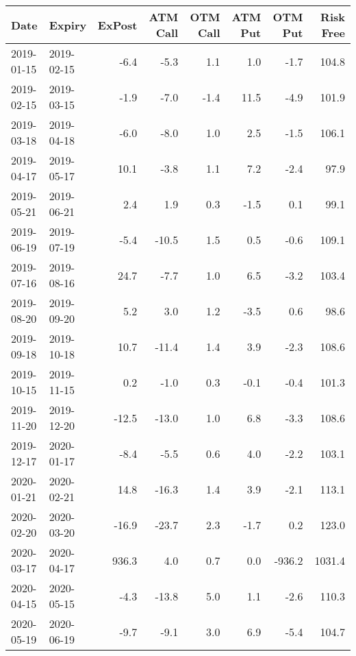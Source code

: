 \begin{tabular}{llrrrrrr}
\hline
 Date       & Expiry     &   ExPost &   ATM Call &   OTM Call &   ATM Put &   OTM Put &   Risk Free \\
\hline
 2019-01-15 & 2019-02-15 &     -6.4 &       -5.3 &        1.1 &       1.0 &      -1.7 &       104.8 \\
 2019-02-15 & 2019-03-15 &     -1.9 &       -7.0 &       -1.4 &      11.5 &      -4.9 &       101.9 \\
 2019-03-18 & 2019-04-18 &     -6.0 &       -8.0 &        1.0 &       2.5 &      -1.5 &       106.1 \\
 2019-04-17 & 2019-05-17 &     10.1 &       -3.8 &        1.1 &       7.2 &      -2.4 &        97.9 \\
 2019-05-21 & 2019-06-21 &      2.4 &        1.9 &        0.3 &      -1.5 &       0.1 &        99.1 \\
 2019-06-19 & 2019-07-19 &     -5.4 &      -10.5 &        1.5 &       0.5 &      -0.6 &       109.1 \\
 2019-07-16 & 2019-08-16 &     24.7 &       -7.7 &        1.0 &       6.5 &      -3.2 &       103.4 \\
 2019-08-20 & 2019-09-20 &      5.2 &        3.0 &        1.2 &      -3.5 &       0.6 &        98.6 \\
 2019-09-18 & 2019-10-18 &     10.7 &      -11.4 &        1.4 &       3.9 &      -2.3 &       108.6 \\
 2019-10-15 & 2019-11-15 &      0.2 &       -1.0 &        0.3 &      -0.1 &      -0.4 &       101.3 \\
 2019-11-20 & 2019-12-20 &    -12.5 &      -13.0 &        1.0 &       6.8 &      -3.3 &       108.6 \\
 2019-12-17 & 2020-01-17 &     -8.4 &       -5.5 &        0.6 &       4.0 &      -2.2 &       103.1 \\
 2020-01-21 & 2020-02-21 &     14.8 &      -16.3 &        1.4 &       3.9 &      -2.1 &       113.1 \\
 2020-02-20 & 2020-03-20 &    -16.9 &      -23.7 &        2.3 &      -1.7 &       0.2 &       123.0 \\
 2020-03-17 & 2020-04-17 &    936.3 &        4.0 &        0.7 &       0.0 &    -936.2 &      1031.4 \\
 2020-04-15 & 2020-05-15 &     -4.3 &      -13.8 &        5.0 &       1.1 &      -2.6 &       110.3 \\
 2020-05-19 & 2020-06-19 &     -9.7 &       -9.1 &        3.0 &       6.9 &      -5.4 &       104.7 \\

\end{tabular}
